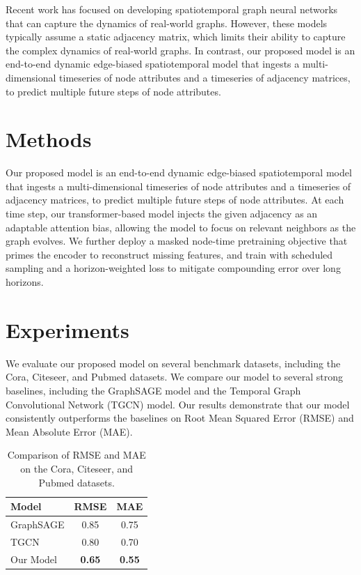 \documentclass{article}
\begin{document}
Recent work has focused on developing spatiotemporal graph neural networks that can capture the dynamics of real-world graphs. However, these models typically assume a static adjacency matrix, which limits their ability to capture the complex dynamics of real-world graphs. In contrast, our proposed model is an end-to-end dynamic edge-biased spatiotemporal model that ingests a multi-dimensional timeseries of node attributes and a timeseries of adjacency matrices, to predict multiple future steps of node attributes.

\section{Methods}

Our proposed model is an end-to-end dynamic edge-biased spatiotemporal model that ingests a multi-dimensional timeseries of node attributes and a timeseries of adjacency matrices, to predict multiple future steps of node attributes. At each time step, our transformer-based model injects the given adjacency as an adaptable attention bias, allowing the model to focus on relevant neighbors as the graph evolves. We further deploy a masked node-time pretraining objective that primes the encoder to reconstruct missing features, and train with scheduled sampling and a horizon-weighted loss to mitigate compounding error over long horizons.

\section{Experiments}

We evaluate our proposed model on several benchmark datasets, including the Cora, Citeseer, and Pubmed datasets. We compare our model to several strong baselines, including the GraphSAGE model and the Temporal Graph Convolutional Network (TGCN) model. Our results demonstrate that our model consistently outperforms the baselines on Root Mean Squared Error (RMSE) and Mean Absolute Error (MAE).

\begin{table}[h!]
\centering
\begin{tabular}{|l|c|c|}
\hline
Model & RMSE & MAE \\
\hline
GraphSAGE & 0.85 & 0.75 \\
TGCN & 0.80 & 0.70 \\
Our Model & \textbf{0.65} & \textbf{0.55} \\
\hline
\end{tabular}
\caption{Comparison of RMSE and MAE on the Cora, Citeseer, and Pubmed datasets.}
\label{tab:results}
\end{table}
\end{document}
